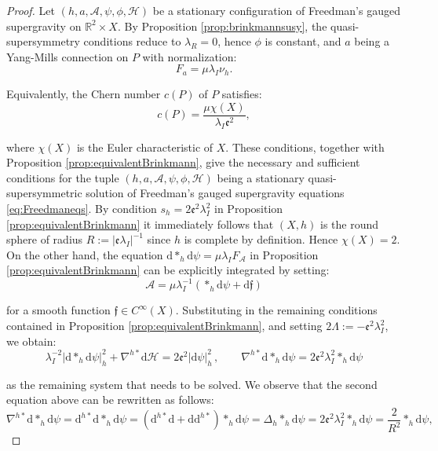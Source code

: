 \documentclass[10pt,a4paper]{amsart}
\def\cA{\mathcal{A}}
\def\cH{\mathcal{H}}
\def\dd{\mathrm{d}}
\def\frf{\mathfrak{f}}
\begin{document}
\begin{proof}
Let $(h, a, \cA, \psi, \phi, \cH)$ be a stationary configuration of Freedman's gauged supergravity on $\mathbb{R}^2 \times X$. By Proposition \ref{prop:brinkmannsusy}, the quasi-supersymmetry conditions reduce to $\lambda_R = 0$, hence $\phi$ is constant, and $a$ being a Yang-Mills connection on $P$ with normalization:
\begin{equation*}
F_a = \mu\lambda_I \nu_h.
\end{equation*}

\noindent
Equivalently, the Chern number $c(P)$ of $P$ satisfies:
\begin{equation*}
c(P) = \frac{\mu \chi(X)}{\lambda_I \mathfrak{e}^2},
\end{equation*}

\noindent
where $\chi(X)$ is the Euler characteristic of $X$. These conditions, together with Proposition \ref{prop:equivalentBrinkmann}, give the necessary and sufficient conditions for the tuple $(h, a, \cA, \psi, \phi, \cH)$ being a stationary quasi-supersymmetric solution of Freedman's gauged supergravity equations \eqref{eq:Freedmaneqs}. By condition $s_h = 2\mathfrak{e}^2 \lambda_I^2$ in Proposition \ref{prop:equivalentBrinkmann} it immediately follows that $(X,h)$ is the round sphere of radius $R := \vert \mathfrak{e} \lambda_I \vert^{-1}$ since $h$ is complete by definition. Hence $\chi(X)=2$. On the other hand, the equation $\dd\ast_h \dd \psi   = \mu\lambda_I F_{\cA}$ in Proposition \ref{prop:equivalentBrinkmann} can be explicitly integrated by setting:
\begin{equation*}
\cA = \mu \lambda^{-1}_I (\ast_h \dd \psi + \dd \mathfrak{f})
\end{equation*}

\noindent
for a smooth function $\frf \in C^{\infty}(X)$. Substituting in the remaining conditions contained in Proposition \ref{prop:equivalentBrinkmann}, and setting $2 \Lambda  := -  \mathfrak{e}^2 \lambda_I^2$, we obtain:
\begin{equation*}
\lambda_I^{-2}\vert \dd\ast_h \dd\psi \vert^2_{h} + \nabla^{h\ast}\dd \cH     =   2 \mathfrak{e}^2 \vert \dd \psi\vert^2_h \, , \qquad \nabla^{h\ast} \dd \ast_h \dd\psi   =     2 \mathfrak{e}^2   \lambda^2_I \ast_h \dd\psi  
\end{equation*}

\noindent
as the remaining system that needs to be solved. We observe that the second equation above can be rewritten as follows:
\begin{equation*}
\nabla^{h\ast} \dd \ast_h \dd\psi  =  \dd^{h\ast}\dd \ast_h \dd \psi =    (\dd^{h\ast}\dd + \dd \dd^{h\ast}) \ast_h \dd \psi = \Delta_h \ast_h \dd \psi = 2 \mathfrak{e}^2   \lambda^2_I \ast_h \dd\psi = \frac{2}{R^2} \ast_h \dd\psi,
\end{equation*}


\end{proof}
\end{document}
